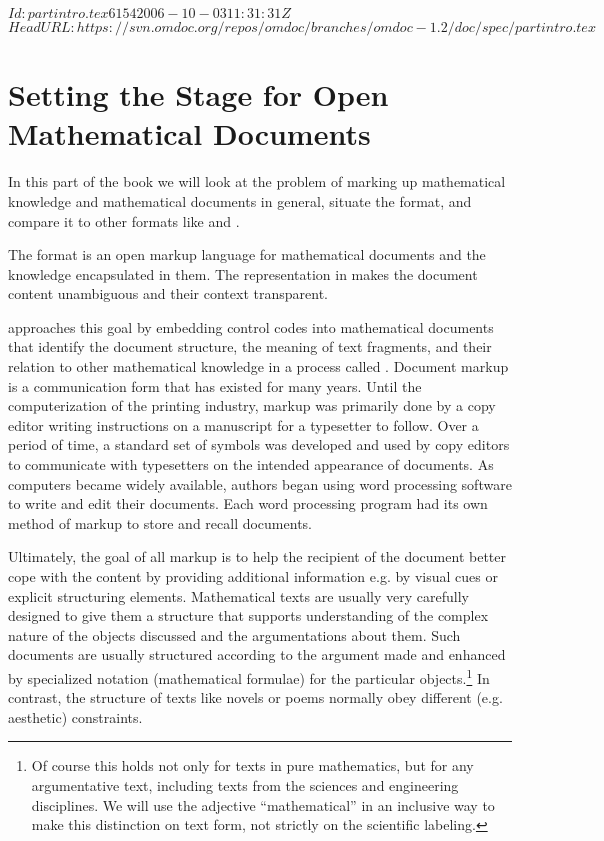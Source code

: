 \svnInfo $Id: partintro.tex 6154 2006-10-03 11:31:31Z  $
\svnKeyword $HeadURL: https://svn.omdoc.org/repos/omdoc/branches/omdoc-1.2/doc/spec/partintro.tex $

\part{Setting the Stage for Open Mathematical Documents}\label{part:markup}

  In this part of the book we will look at the problem of marking up mathematical
  knowledge and mathematical documents in general, situate the {\omdoc} format, and
  compare it to other formats like {\openmath} and {\mathml}.

  The {\omdoc} format is an open markup language for mathematical documents and the
  knowledge encapsulated in them. The representation in
  {\omdoc} makes the document content unambiguous and their context transparent.

  {\omdoc} approaches this goal by embedding control codes into mathematical documents that
  identify the document structure, the meaning of text fragments, and their relation to
  other mathematical knowledge in a process called {}.
  Document markup is a communication form that has existed for many years. Until the
  computerization of the printing industry, markup was primarily done by a copy editor
  writing instructions on a manuscript for a typesetter to follow. Over a period of time,
  a standard set of symbols was developed and used by copy editors to communicate with
  typesetters on the intended appearance of documents. As computers became widely
  available, authors began using word processing software to write and edit their
  documents.  Each word processing program had its own method of markup to store and
  recall documents.

  Ultimately, the goal of all markup is to help the recipient of the document better cope
  with the content by providing additional information e.g. by visual cues or explicit
  structuring elements. Mathematical texts are usually very carefully designed to give
  them a structure that supports understanding of the complex nature of the objects
  discussed and the argumentations about them.  Such documents are usually structured
  according to the argument made and enhanced by specialized notation (mathematical
  formulae) for the particular objects.\footnote{Of course this holds not only for texts
    in pure mathematics, but for any argumentative text, including texts from the sciences
    and engineering disciplines.  We will use the adjective ``mathematical'' in an
    inclusive way to make this distinction on text form, not strictly on the scientific
    labeling.}  In contrast, the structure of texts like novels or poems normally obey
  different (e.g. aesthetic) constraints.

